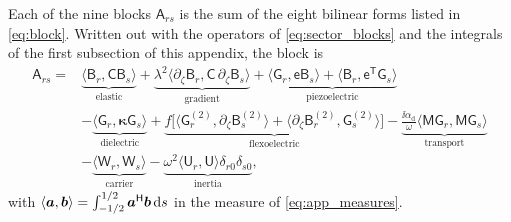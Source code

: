 Each of the nine blocks $\mathsf A_{rs}$ is the sum of the eight bilinear forms
listed in \eqref{eq:block}.  Written out with the operators of
\eqref{eq:sector_blocks} and the integrals of the first subsection of this appendix,
the block is
\begin{equation}
\label{eq:app_block}
\begin{aligned}
\mathsf A_{rs}={}&\underbrace{\bigl\langle\mathsf B_r,\mathsf C\mathsf B_s
\bigr\rangle}_{\text{elastic}}
+\underbrace{\lambda^{2}\bigl\langle\partial_\zeta\mathsf B_r,
\mathsf C\,\partial_\zeta\mathsf B_s\bigr\rangle}_{\text{gradient}}
+\underbrace{\bigl\langle\mathsf G_r,\mathsf e\mathsf B_s\bigr\rangle
+\bigl\langle\mathsf B_r,\mathsf e^{\mathsf T}\mathsf G_s\bigr\rangle}_{\text{piezoelectric}}\\
&-\underbrace{\bigl\langle\mathsf G_r,\boldsymbol\kappa\mathsf G_s\bigr\rangle
}_{\text{dielectric}}
+\underbrace{f\bigl[\bigl\langle\mathsf G_r^{(2)},\partial_\zeta\mathsf B_s^{(2)}
\bigr\rangle+\bigl\langle\partial_\zeta\mathsf B_r^{(2)},\mathsf G_s^{(2)}
\bigr\rangle\bigr]}_{\text{flexoelectric}}
-\underbrace{\frac{\ii\alpha_{\mathrm d}}{\omega}
\bigl\langle\mathsf M\mathsf G_r,\mathsf M\mathsf G_s\bigr\rangle}_{\text{transport}}\\
&-\underbrace{\bigl\langle\mathsf W_r,\mathsf W_s\bigr\rangle}_{\text{carrier}}
-\underbrace{\omega^{2}\bigl\langle\mathsf U_r,\mathsf U\bigr\rangle\delta_{r0}
\delta_{s0}}_{\text{inertia}},
\end{aligned}
\end{equation}
with $\langle\boldsymbol{a},\boldsymbol{b}\rangle=\int_{-1/2}^{1/2}\boldsymbol{a}^{\mathsf H}\boldsymbol{b}\,
\mathrm{d} s$ in the measure of \eqref{eq:app_measures}.

